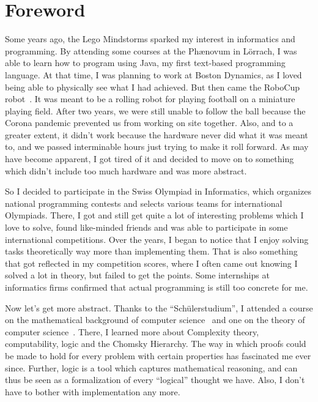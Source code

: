 \chapter*{Foreword}

Some years ago, the Lego Mindstorms sparked my interest in informatics and programming.
By attending some courses at the Phænovum in Lörrach, I was able to learn how to program using Java, my first text-based programming language.
At that time, I was planning to work at Boston Dynamics, as I loved being able to physically see what I had achieved.
But then came the RoboCup robot~\cite{roboCup}.
It was meant to be a rolling robot for playing football on a miniature playing field.
After two years, we were still unable to follow the ball because the Corona pandemic prevented us from working on site together.
Also, and to a greater extent, it didn't work because the hardware never did what it was meant to, and we passed interminable hours just trying to make it roll forward.
As may have become apparent, I got tired of it and decided to move on to something which didn't include too much hardware and was more abstract.

So I decided to participate in the Swiss Olympiad in Informatics, which organizes national programming contests and selects various teams for international Olympiads.
There, I got and still get quite a lot of interesting problems which I love to solve, found like-minded friends and was able to participate in some international competitions.
Over the years, I began to notice that I enjoy solving tasks theoretically way more than implementing them.
That is also something that got reflected in my competition scores, where I often came out knowing I solved a lot in theory, but failed to get the points.
Some internships at informatics firms confirmed that actual programming is still too concrete for me.

Now let's get more abstract.
Thanks to the ``Schülerstudium'', I attended a course on the mathematical background of computer science~\cite{discrete-maths} and one on the theory of computer science~\cite{theory-cs}.
There, I learned more about Complexity theory, computability, logic and the Chomsky Hierarchy.
The way in which proofs could be made to hold for every problem with certain properties has fascinated me ever since.
Further, logic is a tool which captures mathematical reasoning, and can thus be seen as a formalization of every ``logical'' thought we have.
Also, I don't have to bother with implementation any more.

